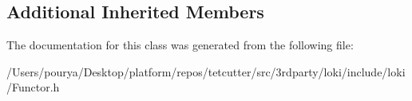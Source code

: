 \subsection*{Additional Inherited Members}


The documentation for this class was generated from the following file\+:\begin{DoxyCompactItemize}
\item 
/\+Users/pourya/\+Desktop/platform/repos/tetcutter/src/3rdparty/loki/include/loki/Functor.\+h\end{DoxyCompactItemize}
